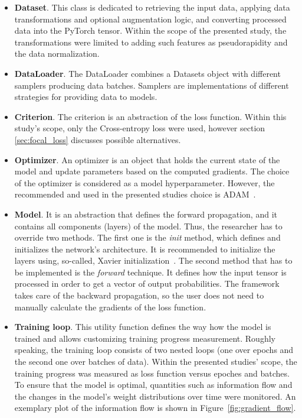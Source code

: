\begin{itemize}
\item \textbf{Dataset}. This class is dedicated to retrieving the input data,  applying data transformations and optional augmentation logic, and converting processed data into the PyTorch tensor.  Within the scope of the presented study, the transformations were limited to adding such features as pseudorapidity and the data normalization. 
 \item \textbf{DataLoader}. The DataLoader combines a Datasets object with different samplers producing data batches. Samplers are implementations of different strategies for providing data to models. 
 
\item \textbf{Criterion}. The criterion is an abstraction of the loss function. Within this study's scope, only the Cross-entropy loss were used, however section \ref{sec:focal_loss} discusses possible alternatives.  

\item \textbf{Optimizer}. An optimizer is an object that holds the current state of the model and update parameters based on the computed gradients. The choice of the optimizer is considered as a model hyperparameter. However, the recommended and used in the presented studies choice is ADAM~\cite{ADAM}. 
\item \textbf{Model}. It is an abstraction that defines the forward propagation, and it contains all components (layers) of the model.
Thus, the researcher has to override two methods. The first one is the \textit{init} method, which defines and initializes the network's architecture. It is recommended to initialize the layers using, so-called, Xavier initialization~\cite{xavier}. The second method that has to be implemented is the \textit{forward} technique. It defines how the input tensor is processed in order to get a vector of output probabilities. The framework takes care of the backward propagation, so the user does not need to manually calculate the gradients of the loss function.

\item \textbf{Training loop}. This utility function defines the way how the model is trained and allows customizing training progress measurement. 
Roughly speaking, the training loop consists of two nested loops (one over epochs and the second one over batches of data). 
Within the presented studies' scope, the training progress was measured as loss function versus epoches and batches. To ensure that the model is optimal, quantities such as information flow and the changes in the model's weight distributions over time were monitored. An exemplary plot of the information flow is shown in Figure~\ref{fig:gradient_flow}.
\end{itemize}

